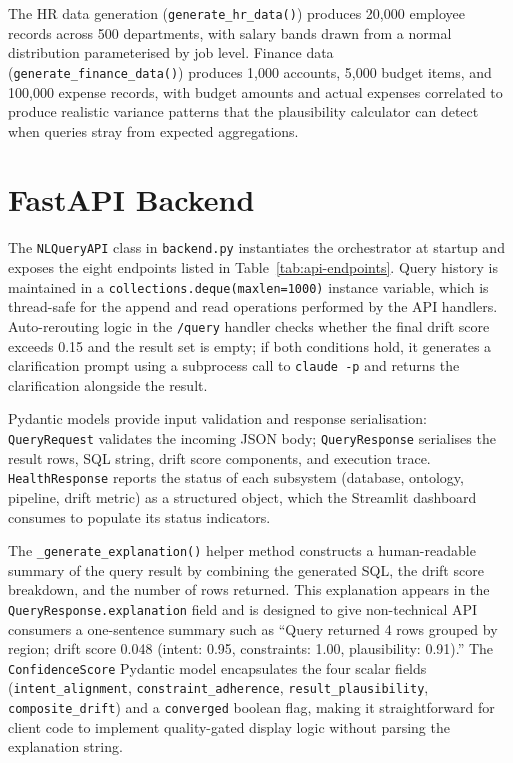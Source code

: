 \documentclass[12pt,a4paper]{report}
\begin{document}
The HR data generation (\texttt{generate\_hr\_data()}) produces 20,000 employee records across 500 departments, with salary bands drawn from a normal distribution parameterised by job level. Finance data (\texttt{generate\_finance\_data()}) produces 1,000 accounts, 5,000 budget items, and 100,000 expense records, with budget amounts and actual expenses correlated to produce realistic variance patterns that the plausibility calculator can detect when queries stray from expected aggregations.

\section{FastAPI Backend}
\label{sec:api-impl}

The \texttt{NLQueryAPI} class in \texttt{backend.py} instantiates the orchestrator at startup and exposes the eight endpoints listed in Table~\ref{tab:api-endpoints}. Query history is maintained in a \texttt{collections.deque(maxlen=1000)} instance variable, which is thread-safe for the append and read operations performed by the \ac{API} handlers. Auto-rerouting logic in the \texttt{/query} handler checks whether the final drift score exceeds 0.15 and the result set is empty; if both conditions hold, it generates a clarification prompt using a subprocess call to \texttt{claude -p} and returns the clarification alongside the result.

Pydantic models provide input validation and response serialisation: \texttt{QueryRequest} validates the incoming JSON body; \texttt{QueryResponse} serialises the result rows, SQL string, drift score components, and execution trace. \texttt{HealthResponse} reports the status of each subsystem (database, ontology, pipeline, drift metric) as a structured object, which the Streamlit dashboard consumes to populate its status indicators.

The \texttt{\_generate\_explanation()} helper method constructs a human-readable summary of the query result by combining the generated \ac{SQL}, the drift score breakdown, and the number of rows returned. This explanation appears in the \texttt{QueryResponse.explanation} field and is designed to give non-technical API consumers a one-sentence summary such as ``Query returned 4 rows grouped by region; drift score 0.048 (intent: 0.95, constraints: 1.00, plausibility: 0.91).'' The \texttt{ConfidenceScore} Pydantic model encapsulates the four scalar fields (\texttt{intent\_alignment}, \texttt{constraint\_adherence}, \texttt{result\_plausibility}, \texttt{composite\_drift}) and a \texttt{converged} boolean flag, making it straightforward for client code to implement quality-gated display logic without parsing the explanation string.
\end{document}
